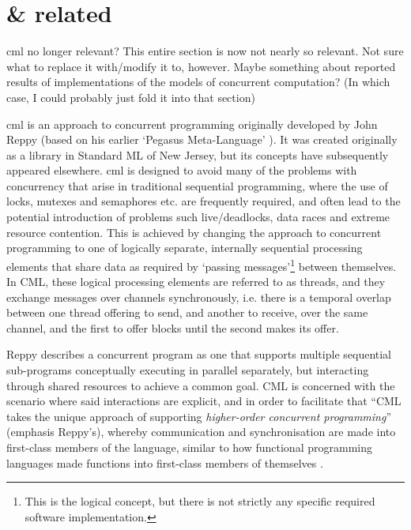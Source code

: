 \section{ \& related}

\begin{anfxerror}{\gls{cml} no longer relevant?}
    This entire section is now not nearly so relevant.  Not sure what to replace it with/modify it to, however.  Maybe something about reported results of implementations of the models of concurrent computation?  (In which case, I could probably just fold it into that section)
\end{anfxerror}

\Gls{cml} \cite{Reppy1991,Panangaden1997} is an approach to concurrent programming originally developed by John Reppy (based on his earlier `Pegasus Meta-Language' \cite{Reppy1988}).  It was created originally as a library in Standard ML of New Jersey, but its concepts have subsequently appeared elsewhere.   \Gls{cml} is designed to avoid many of the problems with concurrency that arise in traditional sequential programming, where the use of locks, mutexes and semaphores etc. are frequently required, and often lead to the potential introduction of problems such live/deadlocks, data races and extreme resource contention.  This is achieved by changing the approach to concurrent programming to one of logically separate, internally sequential processing elements that share data as required by `passing messages'\footnote{This is the logical concept, but there is not strictly any specific required software implementation.} between themselves.  In CML, these logical processing elements are referred to as threads, and they exchange messages over channels synchronously, i.e. there is a temporal overlap between one thread offering to send, and another to receive, over the same channel, and the first to offer blocks until the second makes its offer.

Reppy describes a concurrent program as one that supports multiple sequential sub-programs conceptually executing in parallel separately, but interacting through shared resources to achieve a common goal.  CML is concerned with the scenario where said interactions are explicit, and in order to facilitate that \enquote{CML takes the unique approach of supporting \emph{higher-order concurrent programming}} (emphasis Reppy's), whereby communication and synchronisation are made into first-class members of the language, similar to how functional programming languages made functions into first-class members of themselves \cite[Preface]{Reppy2007}.


